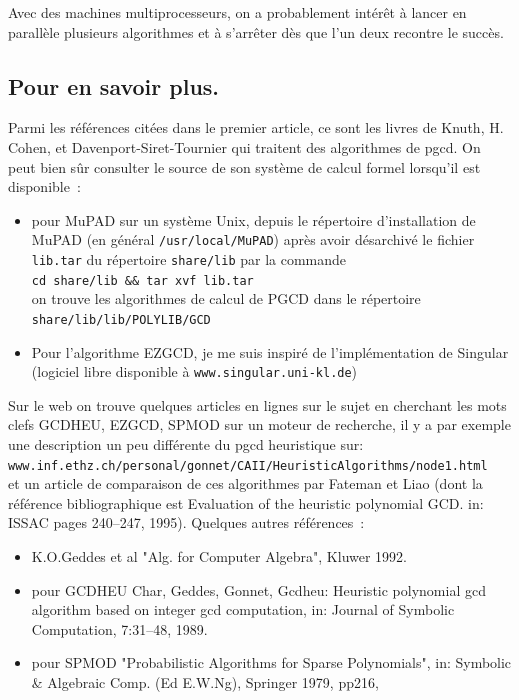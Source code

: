 \documentclass[a4paper,11pt]{article}
\begin{document}
Avec des machines multiprocesseurs, on a probablement intérêt à lancer en
parallèle plusieurs algorithmes et à s'arrêter dès que l'un deux recontre le
succès.

\subsection{Pour en savoir plus.}
Parmi les références citées dans le premier article, ce sont les livres de
Knuth, H. Cohen, et Davenport-Siret-Tournier qui traitent des algorithmes de
pgcd. On peut bien sûr consulter le source de son système de calcul formel
lorsqu'il est disponible~:
\begin{itemize}
\item pour MuPAD sur un système Unix, depuis le
répertoire d'installation de MuPAD (en général {\tt /usr/local/MuPAD})
après avoir désarchivé le fichier {\tt lib.tar} du répertoire {\tt share/lib} 
par la commande \\{\tt cd share/lib \&\& tar xvf lib.tar}\\ 
on trouve les  algorithmes de calcul de PGCD dans le répertoire \\
{\tt share/lib/lib/POLYLIB/GCD}
\item Pour l'algorithme EZGCD, je me suis inspiré de l'implémentation de 
Singular (logiciel libre disponible à {\tt www.singular.uni-kl.de})
\end{itemize}
Sur le web on trouve quelques articles en lignes sur le
sujet en cherchant les mots clefs GCDHEU, EZGCD, SPMOD sur un moteur de 
recherche, il y a par exemple une description un peu différente du pgcd
heuristique sur:\\
{\tt www.inf.ethz.ch/personal/gonnet/CAII/HeuristicAlgorithms/node1.html}\\
et un article de comparaison de ces algorithmes 
par Fateman et Liao (dont la référence bibliographique est
Evaluation of the heuristic polynomial GCD.
in: ISSAC pages 240--247, 1995). Quelques autres références~:
\begin{itemize}
\item K.O.Geddes et al "Alg. for Computer Algebra", Kluwer 1992.
\item pour GCDHEU Char, Geddes, Gonnet, 
Gcdheu: Heuristic polynomial gcd algorithm based on integer gcd computation,
in: Journal of Symbolic Computation, 7:31--48, 1989.
\item pour SPMOD "Probabilistic Algorithms for Sparse Polynomials",
in: Symbolic \& Algebraic Comp. (Ed E.W.Ng), Springer 1979, pp216,
\end{itemize}
\end{document}
